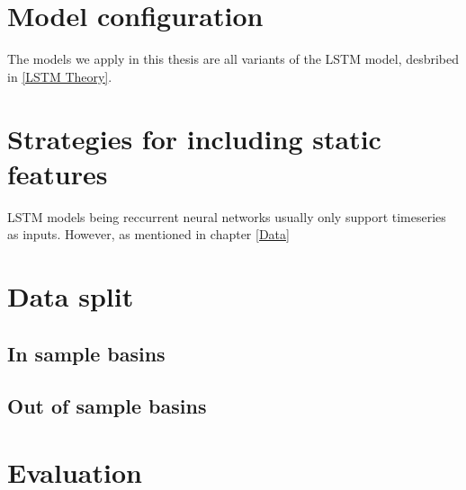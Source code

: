 \section{Model configuration}
The models we apply in this thesis are all variants of the LSTM model, desbribed in \ref{LSTM Theory}.
\section{Strategies for including static features}
LSTM models being reccurrent neural networks usually only support timeseries as 
inputs. However, as mentioned in  chapter \ref{Data}
\section{Data split}
\subsection{In sample basins}
\subsection{Out of sample basins}
\section{Evaluation}
